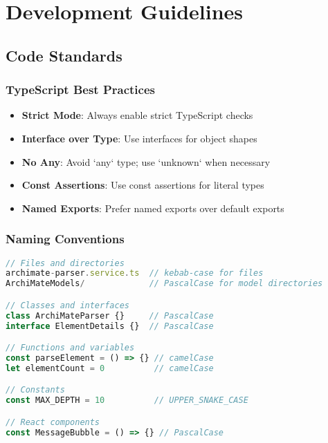 \documentclass[12pt,a4paper]{report}
\begin{document}
\chapter{Development Guidelines}

\section{Code Standards}

\subsection{TypeScript Best Practices}

\begin{itemize}
    \item \textbf{Strict Mode}: Always enable strict TypeScript checks
    \item \textbf{Interface over Type}: Use interfaces for object shapes
    \item \textbf{No Any}: Avoid `any` type; use `unknown` when necessary
    \item \textbf{Const Assertions}: Use const assertions for literal types
    \item \textbf{Named Exports}: Prefer named exports over default exports
\end{itemize}

\subsection{Naming Conventions}

\begin{lstlisting}[language=TypeScript, caption=Naming Standards]
// Files and directories
archimate-parser.service.ts  // kebab-case for files
ArchiMateModels/             // PascalCase for model directories

// Classes and interfaces
class ArchiMateParser {}     // PascalCase
interface ElementDetails {}  // PascalCase

// Functions and variables
const parseElement = () => {} // camelCase
let elementCount = 0          // camelCase

// Constants
const MAX_DEPTH = 10          // UPPER_SNAKE_CASE

// React components
const MessageBubble = () => {} // PascalCase
\end{lstlisting}
\end{document}
